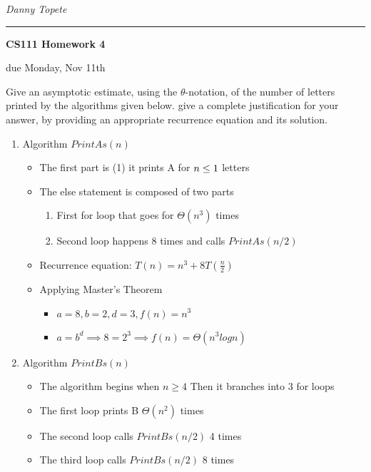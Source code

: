 \documentclass[11pt]{article}
\newcommand{\student}[1]{{\noindent\Large\em {#1} \hfill}\vskip 0.1in}
\newcommand{\assignment}[1]{\centerline{\large\bf CS111 Homework {#1}}}
\newcommand{\duedate}[1]{{\centerline{due {#1}}}}
\newcounter{prnum}
\newenvironment{problem}{{\vskip 0.2in\noindent\bf Problem
       \addtocounter{prnum}{1} \arabic{prnum}.}}{\vskip 0.1in}
\begin{document}
\student{Danny Topete} %
\vskip 0.1in\noindent\hrule\vskip 0.2in
\assignment{4}                           %
\duedate{Monday, Nov 11th}              %


\begin{problem}
Give an asymptotic estimate, using the $\theta$-notation, of the number of letters printed by the
algorithms given below. give a complete justification for your answer, by providing an appropriate recurrence
equation and its solution.

\begin{enumerate}[label=\alph*)]
  \item Algorithm $PrintAs(n)$ 
    \begin{itemize}
      \item The first part is \Theta(1) it prints A for $n \leq\space 1$ letters 
      \item The else statement is composed of two parts
        \begin{enumerate}[label=\alph*)]
          \item First for loop that goes for $\Theta(n^3)$ times
          \item Second loop happens 8 times and calls $PrintAs(n/2)$
        \end{enumerate}
      \item Recurrence equation: $T(n) = n^3 + 8T(\frac{n}{2})$
      \item Applying Master's Theorem
        \begin{itemize}
          \item $a = 8, b = 2, d = 3, f(n) = n^3$
          \item $a = b^d \implies 8 = 2^3 \implies f(n) = \Theta(n^3logn)$
        \end{itemize}
    \end{itemize}
  \item Algorithm $PrintBs(n)$
    \begin{itemize}
      \item The algorithm begins when $n \geq 4$ Then it branches into 3 for loops
      \item The first loop prints B $\Theta(n^2)$ times
      \item The second loop calls $PrintBs(n/2)$ 4 times
      \item The third loop calls $PrintBs(n/2)$ 8 times

\end{itemize}
\end{enumerate}
\end{problem}
\end{document}

